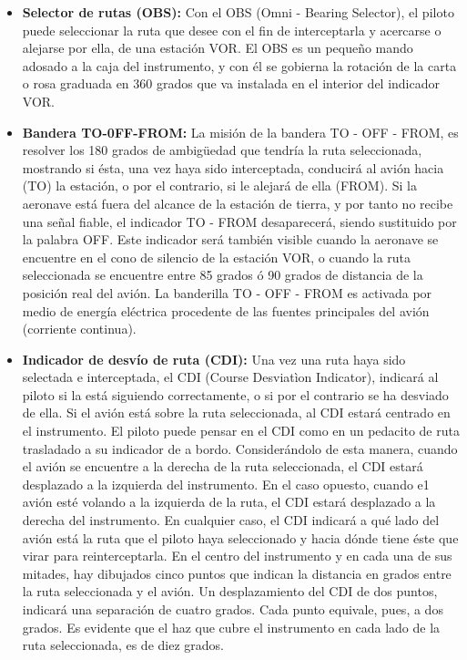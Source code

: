 \begin{itemize}

\item \textbf{Selector de rutas (OBS):} Con el OBS (Omni - Bearing Selector), el piloto puede seleccionar la ruta que desee con el fin de interceptarla y acercarse o alejarse por ella, de una estación VOR. El OBS es un pequeño mando adosado a la caja del instrumento, y con él se gobierna la rotación de la carta o rosa graduada en 360 grados que va instalada en el interior del indicador VOR.


\item \textbf{Bandera TO-0FF-FROM:} La misión de la bandera TO - OFF - FROM, es resolver los 180 grados de ambigüedad que tendría la ruta seleccionada, mostrando si ésta, una vez haya sido interceptada, conducirá al avión hacia (TO) la estación, o por el contrario, si le alejará de ella (FROM). Si la aeronave está fuera del alcance de la estación de tierra, y por tanto no recibe una señal fiable, el indicador  TO - FROM desaparecerá, siendo sustituido por la palabra OFF. Este indicador será también visible cuando la aeronave se encuentre en el cono de silencio de la estación VOR, o cuando la ruta seleccionada se encuentre entre 85 grados ó 90 grados de distancia de la posición real del avión. La banderilla TO - OFF - FROM es activada por medio de energía eléctrica procedente de las fuentes principales del avión (corriente continua).


\item \textbf{Indicador de desvío de ruta (CDI):} Una vez una ruta haya sido selectada e interceptada, el CDI (Course Desviatìon Indicator), indicará al piloto si la está siguiendo correctamente, o si por el contrario se ha desviado de ella. Si el avión está sobre la ruta seleccionada, al CDI estará centrado en el instrumento. El piloto puede pensar en el CDI como en un pedacito de ruta trasladado a su indicador de a bordo. Considerándolo de esta manera, cuando el avión se encuentre a la derecha de la ruta seleccionada, el CDI estará desplazado a la izquierda del instrumento. En el caso opuesto, cuando e1 avión esté volando a la izquierda de la ruta, el CDI estará desplazado a la derecha del instrumento. En cualquier caso, el CDI indicará a qué lado del avión está la ruta que el piloto haya seleccionado y hacia dónde tiene éste que virar para reinterceptarla. En el centro del instrumento y en cada una de sus mitades, hay dibujados cinco puntos que indican la distancia en grados entre la ruta seleccionada y el avión. Un desplazamiento del CDI de dos puntos, indicará una separación de cuatro grados. Cada punto equivale, pues, a dos grados. Es evidente que el haz que cubre el instrumento en cada lado de la ruta seleccionada, es de diez grados.


\end{itemize}
